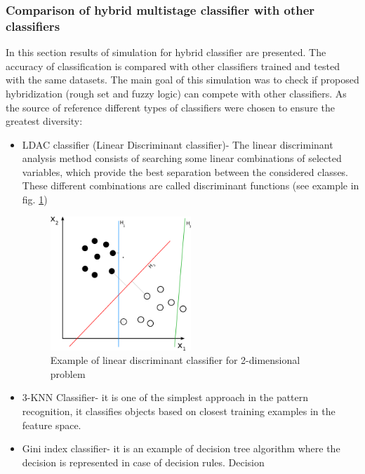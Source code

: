 \subsubsection{Comparison of hybrid multistage classifier with other classifiers}
\label{cha:Simulation_reaearch_5}
In this section results of simulation for hybrid classifier are presented. 
The accuracy of classification is compared with other classifiers trained and 
tested with the same datasets. The main goal of this simulation was to check if proposed
hybridization (rough set and fuzzy logic) can compete with other classifiers. 
As the source of reference different types of classifiers were chosen to ensure the greatest diversity:
\begin{itemize}
    \item LDAC classifier (Linear Discriminant classifier)- The linear
        discriminant analysis method consists of searching some linear
        combinations of selected variables, which provide the best separation between the
        considered classes. These different combinations are called
        discriminant functions (see example in fig. \ref{fig:ldac_example})
        \begin{figure}[H]
            \begin{center}
                \includegraphics[width=0.5\textwidth, height=0.4\textwidth]{fig/ldac.png}
            \end{center}
            \caption{Example of linear discriminant classifier for 2-dimensional problem}
            \label{fig:ldac_example}
        \end{figure}
    \item 3-KNN Classifier- it is one of the simplest approach in the pattern
        recognition, it classifies objects based on closest training examples
        in the feature space.
    \item Gini index classifier- it is an example of decision tree algorithm
        where the decision is represented in case of decision rules.  Decision

\end{itemize}
